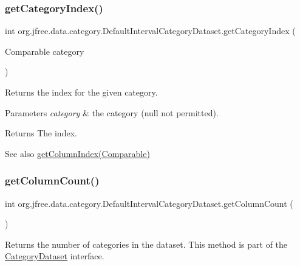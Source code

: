 \subsubsection{\texorpdfstring{get\+Category\+Index()}{getCategoryIndex()}}
{\footnotesize\ttfamily int org.\+jfree.\+data.\+category.\+Default\+Interval\+Category\+Dataset.\+get\+Category\+Index (\begin{DoxyParamCaption}\item[{Comparable}]{category }\end{DoxyParamCaption})}

Returns the index for the given category.


\begin{DoxyParams}{Parameters}
{\em category} & the category ({\ttfamily null} not permitted).\\
\hline
\end{DoxyParams}
\begin{DoxyReturn}{Returns}
The index.
\end{DoxyReturn}
\begin{DoxySeeAlso}{See also}
\mbox{\hyperlink{classorg_1_1jfree_1_1data_1_1category_1_1_default_interval_category_dataset_aa081b358d8813325db79019dafaa2c62}{get\+Column\+Index(\+Comparable)}} 
\end{DoxySeeAlso}
\mbox{\label{classorg_1_1jfree_1_1data_1_1category_1_1_default_interval_category_dataset_a6c5f88da1428294d43e58d41fdf81992}} 
\subsubsection{\texorpdfstring{get\+Column\+Count()}{getColumnCount()}}
{\footnotesize\ttfamily int org.\+jfree.\+data.\+category.\+Default\+Interval\+Category\+Dataset.\+get\+Column\+Count (\begin{DoxyParamCaption}{ }\end{DoxyParamCaption})}

Returns the number of categories in the dataset. This method is part of the \mbox{\hyperlink{interfaceorg_1_1jfree_1_1data_1_1category_1_1_category_dataset}{Category\+Dataset}} interface.

